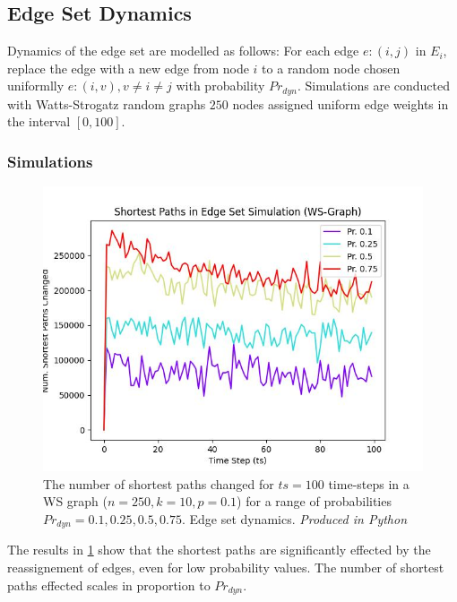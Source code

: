 \documentclass[
	a4paper, %
	10pt, %
	unnumberedsections, %
	twoside, %
]{LTJournalArticle}
\begin{document}
\subsection{Edge Set Dynamics}
Dynamics of the edge set are modelled as follows: For each edge \(e: (i, j)\) in \(E_{i}\), replace the edge with a new edge from node \(i\) to a random node chosen uniformlly \(e: (i, v), v \neq i \neq j\) with probability \(Pr_{dyn}\).  Simulations are conducted with Watts-Strogatz random graphs \(250\) nodes assigned uniform edge weights in the interval \([0, 100]\). \\

\subsubsection{Simulations}

\begin{figure}[H]
	\includegraphics[width=\linewidth]{Figures/esd/paths.jpg}
	\caption{The number of shortest paths changed for \(ts = 100\) time-steps in a WS graph (\(n = 250, k = 10, p = 0.1\)) for a range of probabilities \(Pr_{dyn} = 0.1, 0.25, 0.5, 0.75\). Edge set dynamics. \emph{Produced in Python}}
	\label{fig:esd_paths}
\end{figure}

The results in \ref{fig:esd_paths} show that the shortest paths are significantly effected by the reassignement of edges, even for low probability values. The number of shortest paths effected scales in proportion to \(Pr_{dyn}\).  \\
\end{document}

